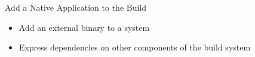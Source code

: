\setuplabframe
{Add a Native Application to the Build}
{
  \begin{itemize}
  \item Add an external binary to a system
  \item Express dependencies on other components of the build system
  \end{itemize}
}
